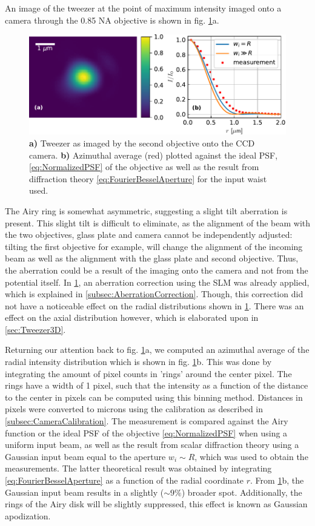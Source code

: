 An image of the tweezer at the point of maximum intensity imaged onto a camera through the 0.85 NA objective is shown in fig. \ref{fig:2Dresults}a. 
\begin{figure}
    \centering
    \includegraphics[width=\linewidth]{figures/AzimuthalAverageSpotZoomed.pdf}
    \caption{\textsf{\textbf{a)}} Tweezer as imaged by the second objective onto the CCD camera. 
	\textsf{\textbf{b)}} Azimuthal average (red) plotted against the ideal \ac{PSF}, \cref{eq:NormalizedPSF} of the objective as well as the result from diffraction theory \cref{eq:FourierBesselAperture} for the input waist used.}
    \label{fig:2Dresults}
\end{figure}
The Airy ring is somewhat asymmetric, suggesting a slight tilt aberration is present.
This slight tilt is difficult to eliminate, as the alignment of the beam with the two objectives, glass plate and camera cannot be independently adjusted: tilting the first objective for example, will change the alignment of the incoming beam as well as the alignment with the glass plate and second objective.
Thus, the aberration could be a result of the imaging onto the camera and not from the potential itself.
In \cref{fig:2Dresults}, an aberration correction using the \ac{SLM} was already applied, which is explained in \cref{subsec:AberrationCorrection}. 
Though, this correction did not have a noticeable effect on the radial distributions shown in \cref{fig:2Dresults}.
There was an effect on the axial distribution however, which is elaborated upon in \cref{sec:Tweezer3D}.

Returning our attention back to fig. \ref{fig:2Dresults}a, we computed an azimuthal average of the radial intensity distribution which is shown in fig. \ref{fig:2Dresults}b.
This was done by integrating the amount of pixel counts in 'rings' around the center pixel.
The rings have a width of 1 pixel, such that the intensity as a function of the distance to the center in pixels can be computed using this binning method.
Distances in pixels were converted to microns using the calibration as described in \cref{subsec:CameraCalibration}.
The measurement is compared against the Airy function or the ideal \ac{PSF} of the objective \cref{eq:NormalizedPSF} when using a uniform input beam, as well as the result from scalar diffraction theory using a Gaussian input beam equal to the aperture $w_i \sim R$, which was used to obtain the measurements.
The latter theoretical result was obtained by integrating \cref{eq:FourierBesselAperture} as a function of the radial coordinate $r$.
From \ref{fig:2Dresults}b, the Gaussian input beam results in a slightly ($\sim 9\%$) broader spot.
Additionally, the rings of the Airy disk will be slightly suppressed, this effect is known as Gaussian apodization.



